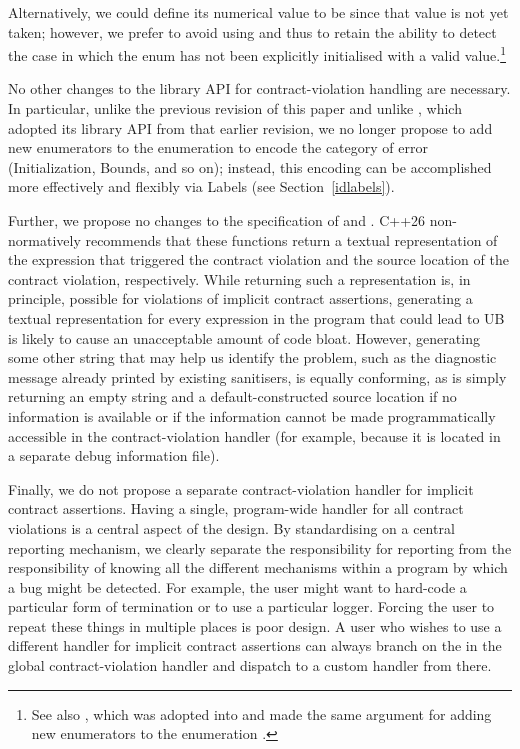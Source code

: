Alternatively, we could define its numerical value to be  since that value is not yet taken; however, we prefer to avoid using  and thus to retain the ability to detect the case in which the enum has not been explicitly initialised with a valid value.\footnote{See also \cite{P3227R0}, which was adopted into \cite{P2900R14} and made the same argument for adding new enumerators to the enumeration .}

No other changes to the library API for contract-violation handling are necessary. In particular, unlike the previous revision of this paper and unlike \cite{P3081R1}, which adopted its library API from that earlier revision, we no longer propose to add new enumerators to the enumeration \mbox{} to encode the category of error (Initialization, Bounds, and so on); instead, this encoding can be accomplished more effectively and flexibly via Labels (see Section~\ref{idlabels}).

Further, we propose no changes to the specification of  and . C++26 non-normatively recommends that these functions return a textual representation of the expression that triggered the contract violation and the source location of the contract violation, respectively. While returning such a representation is, in principle, possible for violations of implicit contract assertions, generating a textual representation for every expression in the program that could lead to UB is likely to cause an unacceptable amount of code bloat. However, generating some other string that may help us identify the problem, such as the diagnostic message already printed by existing sanitisers, is equally conforming, as is simply returning an empty string and a default-constructed source location if no information is available or if the information cannot be made programmatically accessible in the contract-violation handler (for example,
because it is located in a separate debug information file). 

Finally, we do not propose a separate contract-violation handler for implicit contract assertions. Having a single, program-wide handler for all contract violations is a central aspect of the \cite{P2900R14} design. By standardising on a central reporting mechanism, we clearly separate the responsibility for reporting from the responsibility of knowing all the different mechanisms within a program by which a bug might be detected. For example, the user might want to hard-code a particular form of termination or to use a particular logger. Forcing the user to repeat these things in multiple places is poor design. A user who wishes to use a different handler for implicit contract assertions can always branch on the  in the global contract-violation handler and dispatch to a custom handler from there.

